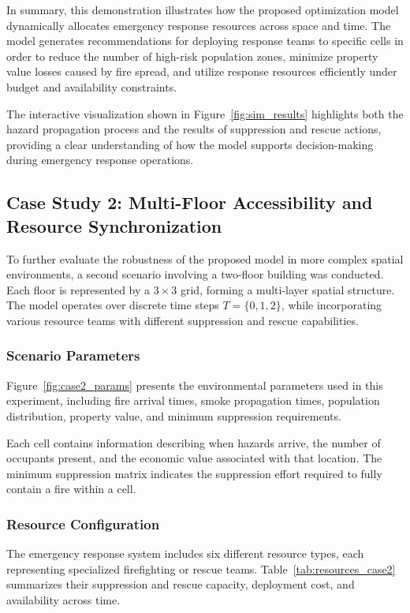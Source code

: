 In summary, this demonstration illustrates how the proposed optimization model dynamically allocates emergency response resources across space and time. The model generates recommendations for deploying response teams to specific cells in order to reduce the number of high-risk population zones, minimize property value losses caused by fire spread, and utilize response resources efficiently under budget and availability constraints.

The interactive visualization shown in Figure~\ref{fig:sim_results} highlights both the hazard propagation process and the results of suppression and rescue actions, providing a clear understanding of how the model supports decision-making during emergency response operations.

\subsection{Case Study 2: Multi-Floor Accessibility and Resource Synchronization}

To further evaluate the robustness of the proposed model in more complex spatial environments, a second scenario involving a two-floor building was conducted. Each floor is represented by a $3 \times 3$ grid, forming a multi-layer spatial structure. The model operates over discrete time steps $T=\{0,1,2\}$, while incorporating various resource teams with different suppression and rescue capabilities.

\subsubsection{Scenario Parameters}

Figure~\ref{fig:case2_params} presents the environmental parameters used in this experiment, including fire arrival times, smoke propagation times, population distribution, property value, and minimum suppression requirements.

Each cell contains information describing when hazards arrive, the number of occupants present, and the economic value associated with that location. The minimum suppression matrix indicates the suppression effort required to fully contain a fire within a cell.

\subsubsection{Resource Configuration}

The emergency response system includes six different resource types, each representing specialized firefighting or rescue teams. Table~\ref{tab:resources_case2} summarizes their suppression and rescue capacity, deployment cost, and availability across time.

